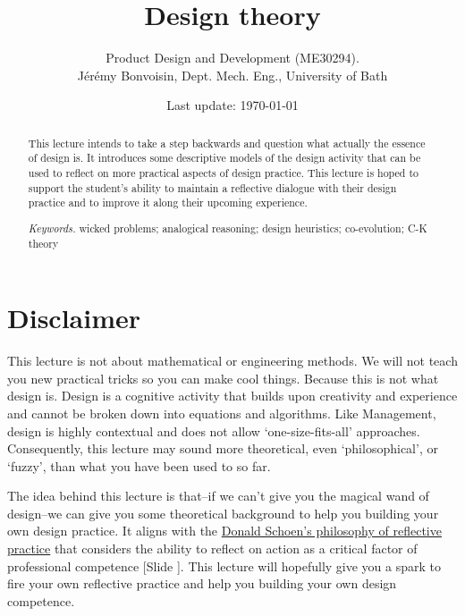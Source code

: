 \documentclass{article}
\newcounter{slide}
\begin{document}
\title{Design theory}

\author{Product Design and Development (ME30294). \\ Jérémy Bonvoisin, Dept. Mech. Eng., University of Bath}
\date{Last update: \today}

\maketitle

\begin{abstract}
This lecture intends to take a step backwards and question what actually the essence of design is. It introduces some descriptive models of the design activity that can be used to reflect on more practical aspects of design practice. This lecture is hoped to support the student's ability to maintain a reflective dialogue with their design practice and to improve it along their upcoming experience. 

{{\it Keywords.} wicked problems; analogical reasoning; design heuristics; co-evolution; C-K theory}
\end{abstract}

\tableofcontents

\section{Disclaimer}
\label{sec:disclaimer}

This lecture is not about mathematical or engineering methods. We will not teach you new practical tricks so you can make cool things. Because this is not what design is. Design is a cognitive activity that builds upon creativity and experience and cannot be broken down into equations and algorithms. Like Management, design is highly contextual and does not allow `one-size-fits-all' approaches. Consequently, this lecture may sound more theoretical, even `philosophical', or `fuzzy', than what you have been used to so far.

The idea behind this lecture is that--if we can't give you the magical wand of design--we can give you some theoretical background to help you building your own design practice. It aligns with the \href{https://en.wikipedia.org/wiki/Reflective_practice#Other_professions}{Donald Schoen's philosophy of reflective practice} that considers the ability to reflect on action as a critical factor of professional competence {\color{blue}[Slide ]}. This lecture will hopefully give you a spark to fire your own reflective practice and help you building your own design competence. 
\end{document}
